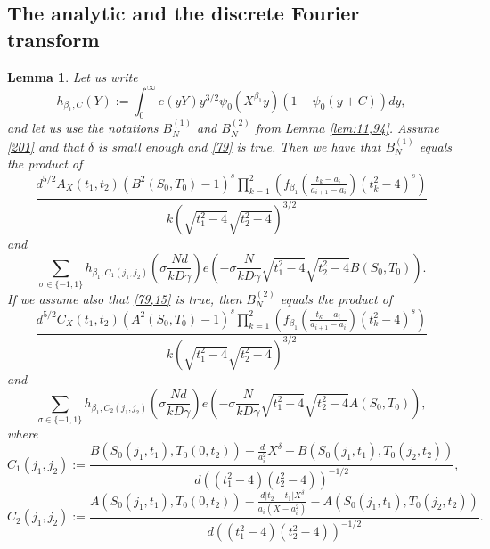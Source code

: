 \documentclass[12pt]{amsart}
\newtheorem{lemma}[theorem]{Lemma}
\theoremstyle{definition}
\numberwithin{equation}{section}
\begin{document}
\subsection{The analytic and the discrete Fourier
transform}


\begin{lemma}\label{lem:11,95}Let us write
\[h_{\beta_1,C}\left(Y\right):=\int_0^{\infty}e\left(yY\right)y^{
3/2}\psi_0\left(X^{\beta_1}y\right)\left(1-\psi_0\left(y+C\right)\right
)dy,\]
and let us use the notations $B_N^{(1)}$ and $B_N^{(2)}$ from Lemma
\ref{lem:11,94}. Assume \eqref{201} and that $\delta$ is small enough and
\eqref{79} is true. Then we have that $B_N^{(1)}$ equals the product of
\[\frac {d^{5/2}A_X\left(t_1,t_2\right)\left(B^2\left(S_0,T_0\right
)-1\right)^s\prod_{k=1}^2\left(f_{\beta_1}\left(\frac {t_k-a_i}{a_{
i+1}-a_i}\right)\left(t_k^2-4\right)^s\right)}{k\left(\sqrt {t_1^
2-4}\sqrt {t_2^2-4}\right)^{3/2}}\]
and
\[\sum_{\sigma\in \{-1,1\}}h_{\beta_1,C_1\left(j_1,j_2\right)}\left
(\sigma\frac {Nd}{kD\gamma}\right)e\left(-\sigma\frac N{kD\gamma}\sqrt {
t_1^2-4}\sqrt {t_2^2-4}B\left(S_0,T_0\right)\right).\]
If we assume also that \eqref{79,15} is true, then $B_N^{(2)}$ equals the product of
\[\frac {d^{5/2}C_X\left(t_1,t_2\right)\left(A^2\left(S_0,T_0\right
)-1\right)^s\prod_{k=1}^2\left(f_{\beta_1}\left(\frac {t_k-a_i}{a_{
i+1}-a_i}\right)\left(t_k^2-4\right)^s\right)}{k\left(\sqrt {t_1^
2-4}\sqrt {t_2^2-4}\right)^{3/2}}\]
and
\[\sum_{\sigma\in \{-1,1\}}h_{\beta_1,C_2\left(j_1,j_2\right)}\left
(\sigma\frac {Nd}{kD\gamma}\right)e\left(-\sigma\frac N{kD\gamma}\sqrt {
t_1^2-4}\sqrt {t_2^2-4}A\left(S_0,T_0\right)\right),\]
where
\[C_1\left(j_1,j_2\right):=\frac {B\left(S_0\left(j_1,t_1\right),
T_0\left(0,t_2\right)\right)-\frac d{a_i^2}X^{\delta}-B\left(S_0\left
(j_1,t_1\right),T_0\left(j_2,t_2\right)\right)}{d\left(\left(t_1^
2-4\right)\left(t_2^2-4\right)\right)^{-1/2}},\]
\[C_2\left(j_1,j_2\right):=\frac {A\left(S_0\left(j_1,t_1\right),
T_0\left(0,t_2\right)\right)-\frac {d\left|t_2-t_1\right|X^{\delta}}{
a_i\left(X-a_i^2\right)}-A\left(S_0\left(j_1,t_1\right),T_0\left(
j_2,t_2\right)\right)}{d\left(\left(t_1^2-4\right)\left(t_2^2-4\right
)\right)^{-1/2}}.\]
\end{lemma}
\end{document}
